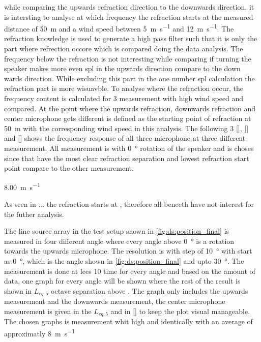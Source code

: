 while comparing the upwards refraction direction to the downwards direction, it is intersting to analyse at which frequency the refraction starts at the measured distance of \SI{50}{\meter} and a wind speed between \SI{5}{\meter\per\second} and \SI{12}{\meter\per\second}. The refraction knowledge is used to generate a high pass filter such that it is only the part where refrection occore which is compared doing the data analysis. The frequency below the refraction is not interesting while comparing if turning the speaker makes more even \gls{spl} in the upwards direction compare to the down wards direction. While excluding this part in the one number \gls{spl} calculation the refraction part is more wisuavble. To analyse where the refraction occur, the frequency content is calculated for 3 measurement with high wind speed and compared. At the point where the upwards refraction, downwards refraction and center microphone gets different is defined as the starting point of refraction at \SI{50}{\meter} with the corresponding wind speed in this analysis. The following 3 \autoref{}, \autoref{} and \autoref{} shows the frequency response of all three microphone at three different measurement. All measurement is with \SI{0}{\degree} rotation of the speaker and is choses since that have the most clear refraction separation and lowest refraction start point compare to the other measurement.



\SI{8.00}{\meter\per\second}

As seen in ... the refraction starts at , therefore all beneeth  have not interest for the futher analysis.


The line source array in the test setup shown in \autoref{fig:ds:position_final} is measured in four different angle where every angle above \SI{0}{\degree} is a rotation towards the upwards microphone. The resolution is with step of \SI{10}{\degree} with start as \SI{0}{\degree}, which is the angle shown in \autoref{fig:ds:position_final} and upto \SI{30}{\degree}. The measurement is done at lees 10 time for every angle and based on the amount of data, one graph for every angle will be shown where the rest of the result is shown in $L_{eq,5}$ octave separation above . The graph only includes the upwards measurement and the downwards measurement, the center microphone measurement is given in the $L_{eq,5}$ and in \autoref{} to keep the plot visual manageable. The chosen graphs is measurement whit high and identically with an average of approximatly \SI{8}{\meter\per\second}


